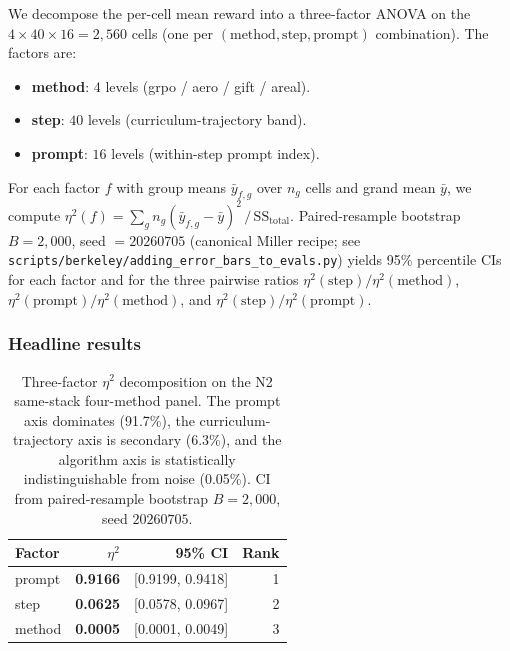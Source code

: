 \documentclass{article}  \usepackage[preprint,nonatbib]{neurips_2026} \usepackage[numbers]{natbib}
\begin{document}
We decompose the per-cell mean reward into a three-factor ANOVA on the
$4 \times 40 \times 16 = 2{,}560$ cells (one per
$(\text{method}, \text{step}, \text{prompt})$ combination). The factors are:

\begin{itemize}
\item \textbf{method}: $4$ levels (grpo / aero / gift / areal).
\item \textbf{step}: $40$ levels (curriculum-trajectory band).
\item \textbf{prompt}: $16$ levels (within-step prompt index).
\end{itemize}

For each factor $f$ with group means $\bar{y}_{f,g}$ over $n_g$ cells and
grand mean $\bar{y}$, we compute
$\eta^2(f) = \sum_g n_g (\bar{y}_{f,g} - \bar{y})^2 \,/\, \text{SS}_{\text{total}}$.
Paired-resample bootstrap $B = 2{,}000$, seed $= 20260705$
(canonical Miller recipe; see \texttt{scripts/berkeley/adding\_error\_bars\_to\_evals.py})
yields 95\% percentile CIs for each factor and for the three pairwise
ratios $\eta^2(\text{step})/\eta^2(\text{method})$,
$\eta^2(\text{prompt})/\eta^2(\text{method})$, and
$\eta^2(\text{step})/\eta^2(\text{prompt})$.

\subsubsection{Headline results}

\begin{table}[h]
\centering
\small
\begin{tabular}{lrrr}
\toprule
\textbf{Factor} & $\eta^2$ & 95\% CI & Rank \\
\midrule
prompt & \textbf{0.9166} & [0.9199, 0.9418] & 1 \\
step   & \textbf{0.0625} & [0.0578, 0.0967] & 2 \\
method & \textbf{0.0005} & [0.0001, 0.0049] & 3 \\
\bottomrule
\end{tabular}
\caption{Three-factor $\eta^2$ decomposition on the N2 same-stack
four-method panel. The prompt axis dominates (91.7\%), the curriculum-trajectory
axis is secondary (6.3\%), and the algorithm axis is statistically
indistinguishable from noise (0.05\%). CI from paired-resample bootstrap
$B = 2{,}000$, seed $20260705$.}
\label{tab:p5-iter141-eta2}
\end{table}
\end{document}
